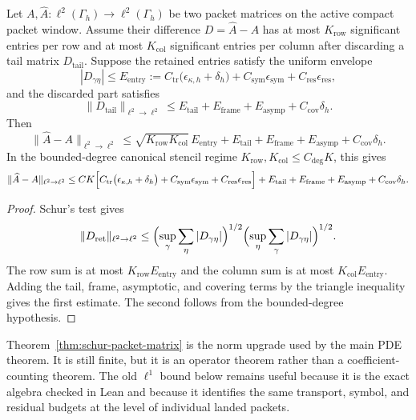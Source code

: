 \begin{theorem}
\label{thm:schur-packet-matrix}
Let $A,\widehat A:\ell^2(\Gamma_h)\to\ell^2(\Gamma_h)$ be two packet matrices on the active compact packet window.  Assume their difference $D=\widehat A-A$ has at most $K_{\mathrm{row}}$ significant entries per row and at most $K_{\mathrm{col}}$ significant entries per column after discarding a tail matrix $D_{\mathrm{tail}}$.  Suppose the retained entries satisfy the uniform envelope
\[
|D_{\gamma\eta}|
\le
E_{\mathrm{entry}}
:=
C_{\mathrm{tr}}\bigl(\epsilon_{\kappa,h}+\delta_h\bigr)
+C_{\mathrm{sym}}\epsilon_{\mathrm{sym}}
+C_{\mathrm{res}}\epsilon_{\mathrm{res}},
\]
and the discarded part satisfies
\[
\|D_{\mathrm{tail}}\|_{\ell^2\to\ell^2}
\le
E_{\mathrm{tail}}+E_{\mathrm{frame}}+E_{\mathrm{asymp}}+C_{\mathrm{cov}}\delta_h .
\]
Then
\[
\|\widehat A-A\|_{\ell^2\to\ell^2}
\le
\sqrt{K_{\mathrm{row}}K_{\mathrm{col}}}\,E_{\mathrm{entry}}
+E_{\mathrm{tail}}+E_{\mathrm{frame}}+E_{\mathrm{asymp}}+C_{\mathrm{cov}}\delta_h .
\]
In the bounded-degree canonical stencil regime $K_{\mathrm{row}},K_{\mathrm{col}}\le C_{\mathrm{deg}}K$, this gives
\[
\|\widehat A-A\|_{\ell^2\to\ell^2}
\le
C K\Bigl[
C_{\mathrm{tr}}\bigl(\epsilon_{\kappa,h}+\delta_h\bigr)
+C_{\mathrm{sym}}\epsilon_{\mathrm{sym}}
+C_{\mathrm{res}}\epsilon_{\mathrm{res}}
\Bigr]
+E_{\mathrm{tail}}+E_{\mathrm{frame}}+E_{\mathrm{asymp}}+C_{\mathrm{cov}}\delta_h .
\]
\end{theorem}

\begin{proof}
Schur's test gives
\[
\|D_{\mathrm{ret}}\|_{\ell^2\to\ell^2}
\le
\Bigl(\sup_\gamma \sum_\eta |D_{\gamma\eta}|\Bigr)^{1/2}
\Bigl(\sup_\eta \sum_\gamma |D_{\gamma\eta}|\Bigr)^{1/2}.
\]
The row sum is at most $K_{\mathrm{row}}E_{\mathrm{entry}}$ and the column sum is at most $K_{\mathrm{col}}E_{\mathrm{entry}}$.  Adding the tail, frame, asymptotic, and covering terms by the triangle inequality gives the first estimate.  The second follows from the bounded-degree hypothesis.
\end{proof}

Theorem~\ref{thm:schur-packet-matrix} is the norm upgrade used by the main PDE theorem.  It is still finite, but it is an operator theorem rather than a coefficient-counting theorem.  The old $\ell^1$ bound below remains useful because it is the exact algebra checked in Lean and because it identifies the same transport, symbol, and residual budgets at the level of individual landed packets.

